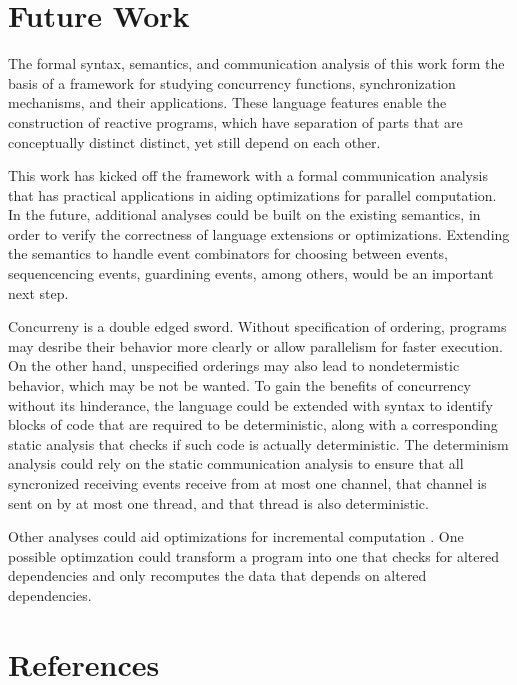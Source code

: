 \documentclass[10pt]{article}
\begin{document}
\section{Future Work}
The formal syntax, semantics, and communication analysis of this work form the basis of
a framework for studying concurrency functions, synchronization mechanisms, and their
applications. These language features enable the construction of reactive programs, which
have separation of parts that are conceptually distinct distinct, yet still depend on each
other.

This work has kicked off the framework with a formal communication analysis that has practical
applications in aiding optimizations for parallel computation.  In the future, additional
analyses could be built on the existing semantics, in order to verify the correctness of language 
extensions or optimizations. Extending the semantics to handle event combinators for choosing
between events, sequencencing events, guardining events, among others, would be an important
next step.

Concurreny is a double edged sword. Without specification of ordering, programs may
desribe their behavior more clearly or allow parallelism for faster execution. On the other hand,
unspecified orderings may also lead to nondetermistic behavior, which may be not be wanted. 
To gain the benefits of concurrency without its hinderance, the language could be extended
with syntax to identify blocks of code that are required to be deterministic,
along with a corresponding static analysis that checks if such code is actually
deterministic. The determinism analysis could rely on the static communication analysis
to ensure that all syncronized receiving events receive from at most one channel,
that channel is sent on by at most one thread, and that thread is also deterministic.

Other analyses could aid optimizations for incremental computation
\cite{acar2009self}.  One possible optimzation could transform a program into one
that checks for altered dependencies and only recomputes the data that depends on altered dependencies.

\section{References}



\end{document}
